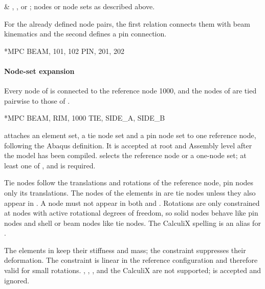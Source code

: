 \begin{keyworddata}
 & , , or ; nodes or node sets as described above. \\
\end{keyworddata}

For the already defined node pairs, the first relation connects them
with beam kinematics and the second defines a pin connection.

\exampleheading
\begin{inputdeck}
*MPC
BEAM, 101, 102
PIN, 201, 202
\end{inputdeck}

\paragraph*{Node-set expansion}
Every node of  is connected to the reference node 1000, and the
nodes of  are tied pairwise to those of .
\begin{inputdeck}
*MPC
BEAM, RIM, 1000
TIE, SIDE_A, SIDE_B
\end{inputdeck}


 attaches an element set, a tie node set and a pin node set to one reference node, following the Abaqus definition. It is accepted at root and Assembly level after the model has been compiled.  selects the reference node or a one-node set; at least one of ,  and  is required.

Tie nodes follow the translations and rotations of the reference node, pin nodes only its translations. The nodes of the elements in  are tie nodes unless they also appear in . A node must not appear in both  and . Rotations are only constrained at nodes with active rotational degrees of freedom, so solid nodes behave like pin nodes and shell or beam nodes like tie nodes. The CalculiX spelling  is an alias for .

The elements in  keep their stiffness and mass; the constraint suppresses their deformation. The constraint is linear in the reference configuration and therefore valid for small rotations. , , ,  and the CalculiX  are not supported;  is accepted and ignored.

